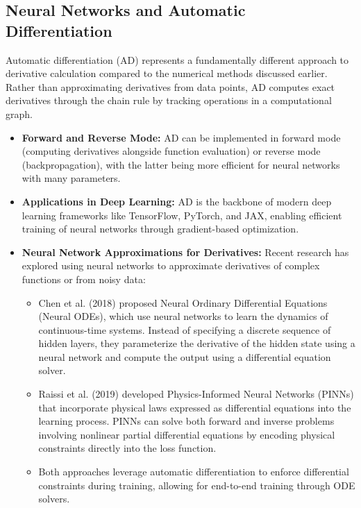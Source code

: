 \documentclass{article}
\begin{document}
\subsection{Neural Networks and Automatic Differentiation}

Automatic differentiation (AD) represents a fundamentally different approach to derivative calculation compared to the numerical methods discussed earlier. Rather than approximating derivatives from data points, AD computes exact derivatives through the chain rule by tracking operations in a computational graph.

\begin{itemize}
    \item \textbf{Forward and Reverse Mode:} AD can be implemented in forward mode (computing derivatives alongside function evaluation) or reverse mode (backpropagation), with the latter being more efficient for neural networks with many parameters.
    
    \item \textbf{Applications in Deep Learning:} AD is the backbone of modern deep learning frameworks like TensorFlow, PyTorch, and JAX, enabling efficient training of neural networks through gradient-based optimization.
    
    \item \textbf{Neural Network Approximations for Derivatives:} Recent research has explored using neural networks to approximate derivatives of complex functions or from noisy data:
    \begin{itemize}
        \item Chen et al. (2018) proposed Neural Ordinary Differential Equations (Neural ODEs), which use neural networks to learn the dynamics of continuous-time systems. Instead of specifying a discrete sequence of hidden layers, they parameterize the derivative of the hidden state using a neural network and compute the output using a differential equation solver.
        
        \item Raissi et al. (2019) developed Physics-Informed Neural Networks (PINNs) that incorporate physical laws expressed as differential equations into the learning process. PINNs can solve both forward and inverse problems involving nonlinear partial differential equations by encoding physical constraints directly into the loss function.
        
        \item Both approaches leverage automatic differentiation to enforce differential constraints during training, allowing for end-to-end training through ODE solvers.
    \end{itemize}
    

\end{itemize}
\end{document}
